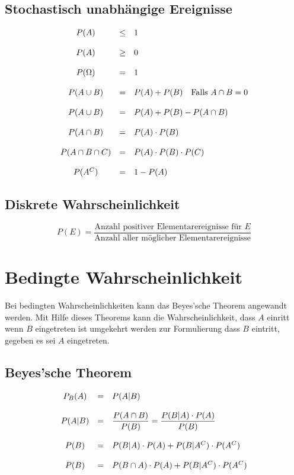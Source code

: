 \subsection{Stochastisch unabhängige Ereignisse}
\[ \begin{array}{c c l}
	P(A)	
		& \leq
		& 1 \\
	& & \\
	P(A) 
		& \geq 
		& 0 \\
	& & \\
	P(\Omega) 
		& = 
		& 1 \\
	& & \\
	P(A \cup B) 
		& = 
		& P(A) + P(B) \quad \text{Falls } A \cap B = 0 \\
	& & \\
	P(A \cup B) 
		& = 
		& P(A) + P(B) - P(A \cap B) \\
	& & \\
	P(A \cap B) 
		& = 
		& P(A) \cdot P(B) \\
	& & \\
	P(A \cap B \cap C) 
		& = 
		& P(A) \cdot P(B) \cdot P(C) \\
	& & \\
	P(A^C) 
		& = 
		& 1 - P(A)
\end{array} \]
	
\subsection{Diskrete Wahrscheinlichkeit}
\[ 
	P(E)
	= \frac{\text{Anzahl positiver Elementarereignisse für } E}{
		\text{Anzahl aller möglicher Elementarereignisse}}
\]

\section{Bedingte Wahrscheinlichkeit}
Bei bedingten Wahrscheinlichkeiten kann das Beyes'sche Theorem angewandt
werden. Mit Hilfe dieses Theorems kann die Wahrscheinlichkeit, dass $A$
einritt wenn $B$ eingetreten ist umgekehrt werden zur Formulierung dass
$B$ eintritt, gegeben es sei $A$ eingetreten.

\subsection{Beyes'sche Theorem}
\[ \begin{array}{c c l}
	P_B(A) 
		& = 
		& P(A|B) \\
	& & \\
	P(A|B)
		& = 
		& \displaystyle \frac{P(A \cap B)}{P(B)} 
			= \displaystyle 
			\frac{P(B|A) \cdot P(A)}{P(B)} \\
	& & \\
	P(B) 
		& = 
		& P(B|A) \cdot P(A) + P(B|A^C) \cdot P(A^C) \\
	& & \\
	P(B) 	
		& = 
		& P(B \cap A) \cdot P(A) + P(B|A^C) \cdot P(A^C)
\end{array} \]

